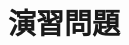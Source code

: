 \documentclass[fleqn]{jsarticle}
\begin{document}

\section{演習問題} \label{sec:exercise}






\end{document}
